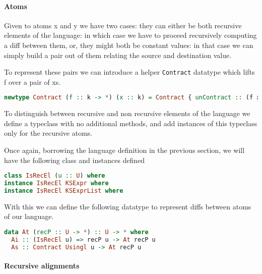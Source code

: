 \documentclass[11pt]{article}
\begin{document}
\paragraph{Atoms}\label{atoms}

Given to atoms x and y we have two cases: they can either be both recursive elements 
of the language: in which case we have to proceed recursively computing a diff 
between them, or, they might both be constant values: in that case we can simply 
build a pair out of them relating the source and destination value.

To represent these pairs we can introduce a helper \texttt{Contract} datatype which 
lifts f over a pair of xs.

\begin{lstlisting}[language=haskell]
  newtype Contract (f :: k -> *) (x :: k) = Contract { unContract :: (f x , f x) }
\end{lstlisting}

To distinguish between recursive and non recursive elements of the language we 
define a typeclass with no additional methods, and add instances of this typeclass only for the recursive atoms.

Once again, borrowing the language definition in the previous section, we will have the following 
class and instances defined
\begin{lstlisting}[language=haskell]
class IsRecEl (u :: U) where
instance IsRecEl KSExpr where
instance IsRecEl KSExprList where
\end{lstlisting}

With this we can define the following datatype to represent diffs between atoms of our language.
\begin{lstlisting}[language=haskell]
data At (recP :: U -> *) :: U -> * where
  Ai :: (IsRecEl u) => recP u -> At recP u
  As :: Contract Usingl u -> At recP u
\end{lstlisting}
\paragraph{Recursive alignments}\label{recursive alignments}
\end{document}
